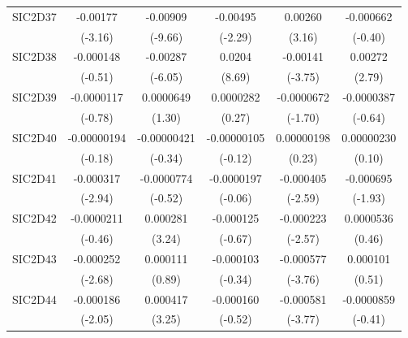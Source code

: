 \begin{table}[htbp]
\begin{tabular}{l*{5}{c}}
SIC2D37     &    -0.00177\sym{**} &    -0.00909\sym{***}&    -0.00495\sym{*}  &     0.00260\sym{**} &   -0.000662         \\
            &     (-3.16)         &     (-9.66)         &     (-2.29)         &      (3.16)         &     (-0.40)         \\
SIC2D38     &   -0.000148         &    -0.00287\sym{***}&      0.0204\sym{***}&    -0.00141\sym{***}&     0.00272\sym{**} \\
            &     (-0.51)         &     (-6.05)         &      (8.69)         &     (-3.75)         &      (2.79)         \\
SIC2D39     &  -0.0000117         &   0.0000649         &   0.0000282         &  -0.0000672         &  -0.0000387         \\
            &     (-0.78)         &      (1.30)         &      (0.27)         &     (-1.70)         &     (-0.64)         \\
SIC2D40     & -0.00000194         & -0.00000421         & -0.00000105         &  0.00000198         &  0.00000230         \\
            &     (-0.18)         &     (-0.34)         &     (-0.12)         &      (0.23)         &      (0.10)         \\
SIC2D41     &   -0.000317\sym{**} &  -0.0000774         &  -0.0000197         &   -0.000405\sym{**} &   -0.000695         \\
            &     (-2.94)         &     (-0.52)         &     (-0.06)         &     (-2.59)         &     (-1.93)         \\
SIC2D42     &  -0.0000211         &    0.000281\sym{**} &   -0.000125         &   -0.000223\sym{*}  &   0.0000536         \\
            &     (-0.46)         &      (3.24)         &     (-0.67)         &     (-2.57)         &      (0.46)         \\
SIC2D43     &   -0.000252\sym{**} &    0.000111         &   -0.000103         &   -0.000577\sym{***}&    0.000101         \\
            &     (-2.68)         &      (0.89)         &     (-0.34)         &     (-3.76)         &      (0.51)         \\
SIC2D44     &   -0.000186\sym{*}  &    0.000417\sym{**} &   -0.000160         &   -0.000581\sym{***}&  -0.0000859         \\
            &     (-2.05)         &      (3.25)         &     (-0.52)         &     (-3.77)         &     (-0.41)         \\

\end{tabular}
\end{table}
